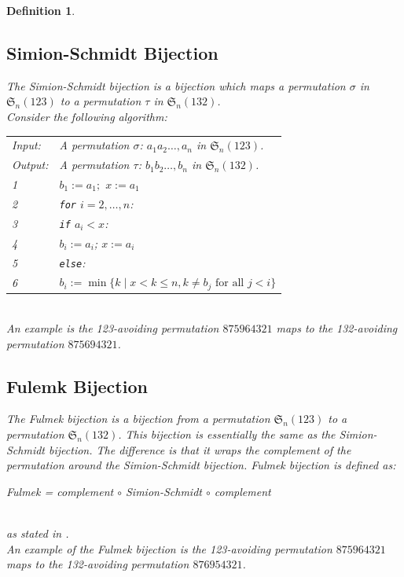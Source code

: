 \documentclass[12pt]{article}
\newtheorem{definition}{Definition}
\newcommand{\sym}{\mathfrak{S}}
\begin{document}
\begin{definition}
\subsection{Simion-Schmidt Bijection}
\label{sec:SSBijection}
The Simion-Schmidt bijection is a bijection which maps a permutation $\sigma$ in $\sym_n(123)$ to a permutation $\tau$ in $\sym_n(132)$.\cite{Clae01}\\
Consider the following algorithm: \\
\begin{tabular}{ll}
Input:  & A permutation $\sigma$: $a_1a_2\dots,a_n$ in $\sym_n(123)$.\\
Output: & A permutation $\tau$: $b_1b_2\dots,b_n$ in $\sym_n(132)$. \\
1 &\mbox{} $b_1:=a_1;$ $x:=a_1$\\
2 &\mbox{} {\tt for} $i=2, \dots,  n$: \\
3 &\mbox{} \quad\; {\tt if} $a_i < x$: \\
4 &\mbox{} \quad\;\quad\; $b_i:=a_i$; $x:=a_i$\\
5 &\mbox{} \quad\; {\tt else}:\\
6 &\mbox{} \quad\;\quad\;
$b_i:=\min\{k\mid x<k\leq n,k\neq b_j\textrm{ for all } j<i\}$\\
\end{tabular}\\
An example is the 123-avoiding permutation $875964321$ maps to the 132-avoiding permutation $875694321$.

\subsection{Fulemk Bijection}
The Fulmek bijection is a bijection from a permutation $\sym_n(123)$ to a permutation $\sym_n(132)$. This bijection is essentially the same as the Simion-Schmidt bijection. The difference is that it wraps the complement of the permutation around the Simion-Schmidt bijection. Fulmek bijection is defined as:\\
\centerline{Fulmek = complement $\circ$ Simion-Schmidt $\circ$ complement}\\
as stated in \cite{Clae01}.\\
An example of the Fulmek bijection is the 123-avoiding permutation $875964321$ maps to the 132-avoiding permutation $876954321$.


\end{definition}
\end{document}
